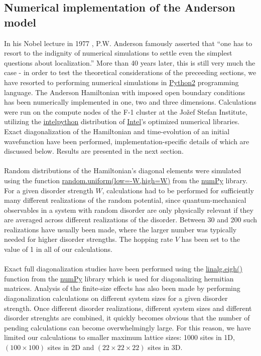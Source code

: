 \documentclass[10pt,a4paper]{article}
\begin{document}
\subsection{Numerical implementation of the Anderson model}
\label{sec:num}
In his Nobel lecture in 1977 \cite{and_nobel}, P.W. Anderson famously asserted that  ``one has to resort to the indignity of numerical simulations to settle even the simplest questions about localization.'' More than 40 years later, this is still very much the case - in order to test the theoretical considerations of the preceeding sections, we have resorted to performing numerical simulations in \url{Python2} programming language. The Anderson Hamiltonian with imposed open boundary conditions has been numerically implemented in one, two and three dimensions.  Calculations were run on the compute nodes of the F-1 cluster at the Jožef Stefan Institute, utilizing the \url{intelpython} distribution of \url{Intel}'s optimized numerical libraries. Exact diagonalization of the Hamiltonian and time-evolution of an initial wavefunction have been performed, implementation-specific details of which are discussed below. Results are presented in the next section.\\\\
\noindent Random distributions of the Hamiltonian's diagonal elements were simulated using the function \url{random.uniform(low=-W,high=W)} from the \url{numPy} library. For a given disorder strength $W$, calculations had to be performed for sufficiently many different realizations of the random potential, since quantum-mechanical observables in a system with random disorder are only physically relevant if they are averaged across different realizations of the disorder. Between 30 and 200 such realizations have usually been made, where the larger number was typically needed for higher disorder strengths. The hopping rate $V$ has been set to the value of 1 in all of our calculations.\\\\
\noindent Exact full diagonalization studies have been performed using the \url{linalg.eigh()} function from the \url{numPy} library which is used for diagonalizing hermitian matrices. Analysis of the finite-size effects has also been made by performing diagonalization calculations on different system sizes for a given disorder strength. Once different disorder realizations, different system sizes and different disorder strenghts are combined, it quickly becomes obvious that the number of pending calculations can become overwhelmingly large. For this reason, we have limited our calculations to smaller maximum lattice sizes: 1000 sites in 1D, $(100\times100)$ sites in 2D and $(22\times22\times22)$ sites in 3D. \\\\
\end{document}
